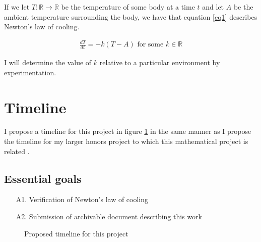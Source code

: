 \documentclass[12pt]{amsart}
\newcommand{\reals}{\mathbb{R}}
\begin{document}
If we let $T: \reals \to \reals$ be the temperature
of some body at a time $t$
and let $A$ be the ambient temperature
surrounding the body,
we have that equation \ref{eq1}
describes Newton's law of cooling.

\begin{align} \label{eq1}
	\frac{dT}{dt} = -k(T - A) \textrm{ for some $k \in \reals$}
\end{align}

I will determine the value of $k$
relative to a particular environment by experimentation.

\section{Timeline}

I propose a timeline for this project in figure \ref{timeline}
in the same manner as I propose the timeline for
my larger honors project to which this
mathematical project is related \citep{rpi_plan}.

\subsection{Essential goals}

\begin{enumerate}
	\item[A1.] Verification of Newton's law of cooling
	\item[A2.] Submission of archivable document describing this work
\end{enumerate}


\begin{figure}


  \centering
  \caption{Proposed timeline for this project}
  \label{timeline}

\end{figure}



\end{document}
